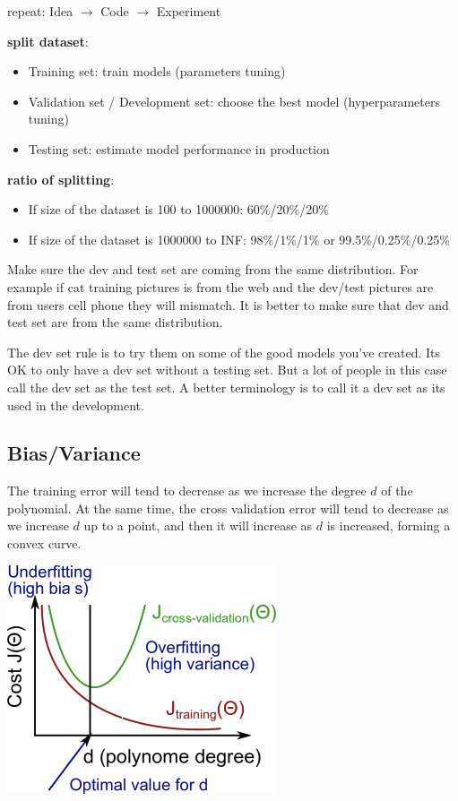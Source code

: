 \documentclass{article}
\begin{document}
\noindent repeat: Idea \(\longrightarrow\) Code \(\longrightarrow\) Experiment

\bigskip

\noindent \textbf{split dataset}:

\begin{itemize}
  \item Training set: train models (parameters tuning)
  \item Validation set / Development set: choose the best model (hyperparameters tuning)
  \item Testing set: estimate model performance in production
\end{itemize}

\noindent \textbf{ratio of splitting}:
\begin{itemize}
  \item If size of the dataset is 100 to 1000000: 60\%/20\%/20\%
  \item If size of the dataset is 1000000 to INF: 98\%/1\%/1\% or 99.5\%/0.25\%/0.25\%
\end{itemize}

\noindent Make sure the dev and test set are coming from the same distribution. For example if cat training pictures is from the web and the dev/test pictures are from users cell phone they will mismatch. It is better to make sure that dev and test set are from the same distribution.

\bigskip

\noindent The dev set rule is to try them on some of the good models you've created. Its OK to only have a dev set without a testing set. But a lot of people in this case call the dev set as the test set. A better terminology is to call it a dev set as its used in the development.

\subsection{Bias/Variance}

\noindent The training error will tend to decrease as we increase the degree \(d\) of the polynomial. At the same time, the cross validation error will tend to decrease as we increase \(d\) up to a point, and then it will increase as \(d\) is increased, forming a convex curve.

\begin{center}
\includegraphics[scale=0.4]{./images/bias_and_variance_polynomial.png}
\end{center}
\end{document}
